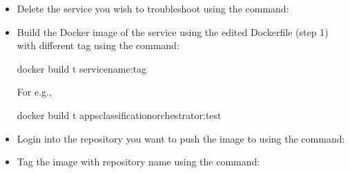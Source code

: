 \documentclass[letterpaper,10pt,english]{sphinxmanual}
\begin{document}
\begin{enumerate}
\begin{itemize}
\item {} 
Delete the service you wish to troubleshoot using the command:

\begin{sphinxVerbatim}[commandchars=\\\{\}]
   
\end{sphinxVerbatim}

\item {} 
Build the Docker image of the service using the edited Dockerfile (step 1) with different tag using the command:

\begin{sphinxVerbatim}[commandchars=\\\{\}]
   docker build \textendash{}t \PYGZlt{}service\PYGZhy{}name\PYGZgt{}:\PYGZlt{}tag\PYGZgt{}

For e.g.,

   docker build \textendash{}t apps\PYGZhy{}classification\PYGZhy{}orchestrator:test
\end{sphinxVerbatim}

\item {} 
Login into the repository you want to push the image to using the command:

\begin{sphinxVerbatim}[commandchars=\\\{\}]
           

 

          
\end{sphinxVerbatim}

\item {} 
Tag the image with repository name using the command:

\begin{sphinxVerbatim}[commandchars=\\\{\}]
        


\end{sphinxVerbatim}
\end{itemize}
\end{enumerate}
\end{document}
